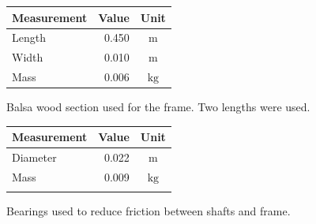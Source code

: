 \documentclass[a4paper]{article}
\begin{document}
\begin{figure}[h]
	\centering
	\begin{minipage}[t]{0.45\textwidth}
		\centering
		\begin{tabular}{p{3.5cm}rc}
			\toprule
			Measurement & Value & Unit \\
			\midrule
			Length & 0.450 & $\si{\meter}$ \\
			Width & 0.010 & $\si{\meter}$  \\
			Mass & 0.006 & $\si{\kilogram}$ \\
			\bottomrule
		\end{tabular}
		
		\vspace{0.5cm}
		
		\caption{Balsa wood section used for the frame. Two lengths were used.}
	\end{minipage}
	\hspace{1cm}
	\begin{minipage}[t]{0.45\textwidth}
		\centering
		\begin{tabular}{p{3.5cm}rc}
			\toprule
			Measurement & Value & Unit \\
			\midrule
			Diameter & 0.022 & $\si{\meter}$ \\
			Mass & 0.009 & $\si{\kilogram}$ \\
			 & \\
			\bottomrule
		\end{tabular}
		
		\vspace{0.5cm}
		
		\caption{Bearings used to reduce friction between shafts and frame.}
	\end{minipage}
\end{figure}
\end{document}
